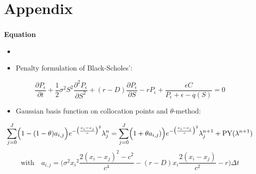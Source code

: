 \section{Appendix}

\begin{frame}
\frametitle{\insertsection}
\textbf{Equation}
\begin{itemize}
	\item []
	\item Penalty formulation of Black-Scholes':
\end{itemize}
\begin{equation*}
	\frac{\partial P_\epsilon}{\partial t} +
	\frac{1}{2}\sigma^2S^2 \frac{\partial^2 P_\epsilon}{{\partial S}^2} +
	(r-D)\frac{\partial P_\epsilon}{\partial S} - r P_\epsilon +
	\frac{\epsilon C}{P_{\epsilon}+\epsilon -q(S)} = 0
\end{equation*}
\begin{itemize}
	\item Gaussian basis function on collocation points and $\theta$-method:
\end{itemize}
\begin{equation*}
	\sum_{j=0}^{J} \Bigl(1-(1-\theta)a_{i,j}\Bigr) e^{-\bigl(\frac{x_i-x_j}{c}\bigr)^2} \lambda^n_{j} = 
	\sum_{j=0}^{J} \Bigl(1+\theta a_{i,j})\Bigr) e^{-\bigl(\frac{x_i-x_j}{c}\bigr)^2} \lambda^{n+1}_{j} + \text{PY}(\lambda^{n+1}) %
\end{equation*}
\begin{equation*}
	\text{with} \quad
	a_{i,j}= \biggl(\sigma^2{x_i}^2 \frac{2(x_i-x_j)^2-c^2}{c^4}-(r-D)x_i \frac{2(x_i-x_j)}{c^2}-r\biggr)\Delta t
\end{equation*}
\end{frame}